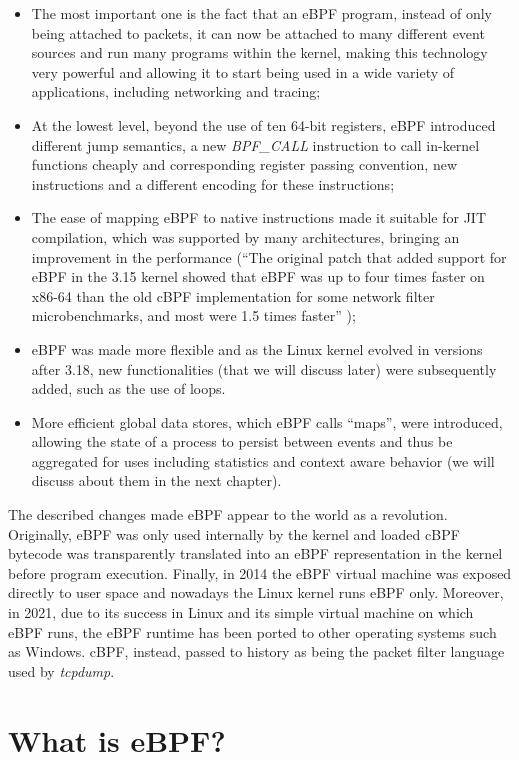 \begin{itemize}
	\item The most important one is the fact that an eBPF program, instead of only
		being attached to packets, it can now be attached to many different event sources and run many programs within the kernel, making this technology very powerful and allowing it to start being used in a wide variety of applications, including networking and tracing;
	\item At the lowest level, beyond the use of ten 64-bit registers, eBPF
		introduced different jump semantics, a new \textit{BPF\_CALL} instruction to call in-kernel functions cheaply and corresponding register passing convention, new instructions and a different encoding for these instructions;
	\item The ease of mapping eBPF to native instructions made it suitable for
		JIT compilation, which was supported by many architectures, bringing an improvement in the performance (``The original patch that added support for eBPF in the 3.15 kernel showed that eBPF was up to four times faster on x86-64 than the old cBPF implementation for some network filter microbenchmarks, and most were 1.5 times faster'' \cite{eBPFThroughIntroduction});
	\item eBPF was made more flexible and as the Linux kernel evolved in versions
		after 3.18, new functionalities (that we will discuss later) were subsequently added, such as the use of loops.
	\item More efficient global data stores, which eBPF calls ``maps'', were 
		introduced, allowing the state of a process to persist between events and thus be aggregated for uses including statistics and context aware behavior (we will discuss about them in the next chapter).
\end{itemize}

The described changes made eBPF appear to the world as a revolution.
Originally, eBPF was only used internally by the kernel and loaded cBPF bytecode was transparently translated into an eBPF representation in the kernel before program execution.
Finally, in 2014 the eBPF virtual machine was exposed directly to user space and nowadays the Linux kernel runs eBPF only.
Moreover, in 2021, due to its success in Linux and its simple virtual machine on which eBPF runs, the eBPF runtime has been ported to other operating systems such as Windows.
cBPF, instead, passed to history as being the packet filter language used by \textit{tcpdump}.

\section{What is eBPF?}


